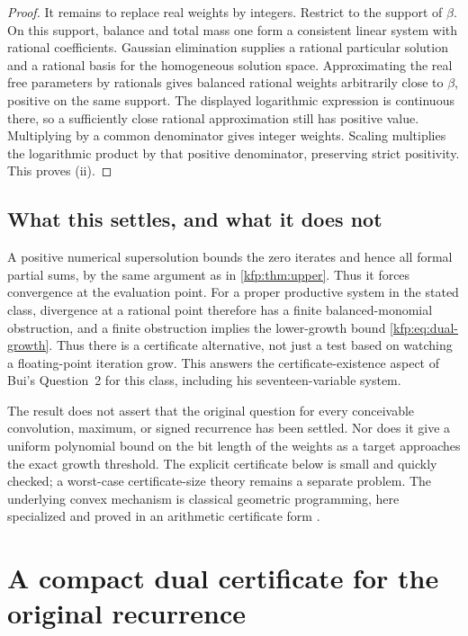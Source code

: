 \documentclass[11pt,a4paper]{article}
\theoremstyle{definition}
\theoremstyle{remark}
\begin{document}
\begin{proof}
It remains to replace real weights by integers. Restrict to the support of
$\beta$. On this support, balance and total mass one form a consistent
linear system with rational coefficients. Gaussian elimination supplies a
rational particular solution and a rational basis for the homogeneous
solution space. Approximating the real free parameters by rationals gives
balanced rational weights arbitrarily close to $\beta$, positive on the
same support. The displayed logarithmic expression is continuous there,
so a sufficiently close rational approximation still has positive value.
Multiplying by a common denominator gives integer weights. Scaling multiplies
the logarithmic product by that positive denominator, preserving strict
positivity. This proves (ii).
\end{proof}

\subsection{What this settles, and what it does not}
A positive numerical supersolution bounds the zero iterates and hence all
formal partial sums, by the same argument as in \cref{kfp:thm:upper}. Thus it
forces convergence at the evaluation point. For a proper productive system
in the stated class, divergence at a rational point therefore has a finite
balanced-monomial obstruction, and a finite obstruction
implies the lower-growth bound \eqref{kfp:eq:dual-growth}. Thus there is a
certificate alternative, not just a test based on watching a floating-point
iteration grow. This answers the certificate-existence aspect of Bui's
Question~2 for this class, including his seventeen-variable system.

The result does not assert that the original question for every conceivable
convolution, maximum, or signed recurrence has been settled. Nor does it give
a uniform polynomial bound on the bit length of the weights as a target
approaches the exact growth threshold. The explicit certificate below is
small and quickly checked; a worst-case certificate-size theory remains a
separate problem. The underlying convex mechanism is classical geometric
programming, here specialized and proved in an arithmetic certificate form
\cite{duffin,boyd,bv}.

\section{A compact dual certificate for the original recurrence}
\label{kfp:sec:dual-example}
\end{document}
